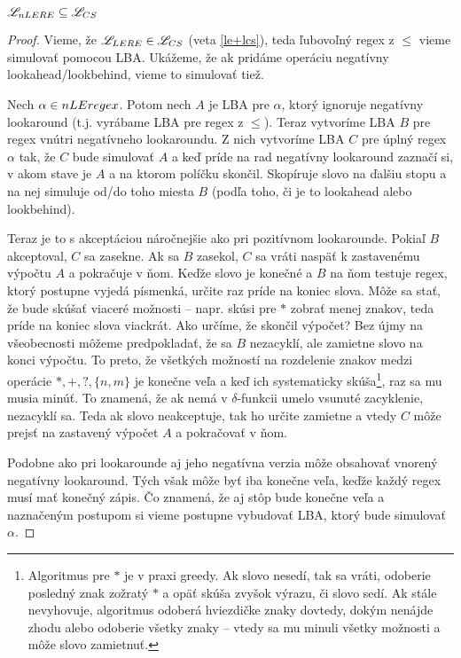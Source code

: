 \begin{veta}
$ \mathscr{L}_{nLERE} \subseteq \mathscr{L}_{CS} $
\end{veta}
\begin{proof}
Vieme, že $ \mathscr{L}_{LERE} \in \mathscr{L}_{CS} $ (veta \ref{le+lcs}), teda ľubovoľný regex z $\le$ vieme simulovať pomocou LBA. Ukážeme, že ak pridáme operáciu negatívny lookahead/lookbehind, vieme to simulovať tiež.

Nech $\alpha \in nLEregex$. Potom nech $A$ je LBA pre $\alpha$, ktorý ignoruje negatívny lookaround (t.j. vyrábame LBA pre regex z $\le$). Teraz vytvoríme LBA $B$ pre regex vnútri negatívneho lookaroundu. Z nich vytvoríme LBA $C$ pre úplný regex $\alpha$ tak, že $C$ bude simulovať $A$ a keď príde na rad negatívny lookaround zaznačí si, v akom stave je $A$ a na ktorom políčku skončil. Skopíruje slovo na ďalšiu stopu a na nej simuluje od/do toho miesta $B$ (podľa toho, či je to lookahead alebo lookbehind). 

Teraz je to s akceptáciou náročnejšie ako pri pozitívnom lookarounde. Pokiaľ $B$ akceptoval, $C$ sa zasekne. Ak sa $B$ zasekol, $C$ sa vráti naspäť k zastavenému výpočtu $A$ a pokračuje v ňom. Keďže slovo je konečné a $B$ na ňom testuje regex, ktorý postupne vyjedá písmenká, určite raz príde na koniec slova. Môže sa stať, že bude skúšať viaceré možnosti -- napr. skúsi pre $*$ zobrať menej znakov, teda príde na koniec slova viackrát. Ako určíme, že skončil výpočet? Bez újmy na všeobecnosti môžeme predpokladať, že sa $B$ nezacyklí, ale zamietne slovo na konci výpočtu. To preto, že všetkých možností na rozdelenie znakov medzi operácie $*,+,?,\lbrace n,m\rbrace$ je konečne veľa a keď ich systematicky skúša\footnote{Algoritmus pre $*$ je v praxi greedy. Ak slovo nesedí, tak sa vráti, odoberie posledný znak zožratý $*$ a opäť skúša zvyšok výrazu, či slovo sedí. Ak stále nevyhovuje, algoritmus odoberá hviezdičke znaky dovtedy, dokým nenájde zhodu alebo odoberie všetky znaky -- vtedy sa mu minuli všetky možnosti a môže slovo zamietnuť.}, raz sa mu musia minúť. To znamená, že ak nemá v $\delta$-funkcii umelo vsunuté zacyklenie, nezacyklí sa. Teda ak slovo neakceptuje, tak ho určite zamietne a vtedy $C$ môže prejsť na zastavený výpočet $A$ a pokračovať v ňom.

Podobne ako pri lookarounde aj jeho negatívna verzia môže obsahovať vnorený negatívny lookaround. Tých však môže byť iba konečne veľa, keďže každý regex musí mať konečný zápis. Čo znamená, že aj stôp bude konečne veľa a naznačeným postupom si vieme postupne vybudovať LBA, ktorý bude simulovať $\alpha$.
\end{proof}

